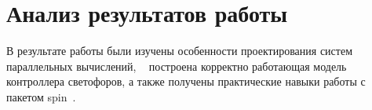 \documentclass[a4papaer,12pt]{article}
\begin{document}
\section{Анализ результатов работы}

В результате работы были изучены особенности проектирования систем параллельных вычислений,
~\cite{verification} построена корректно работающая модель контроллера светофоров, а также получены практические
навыки работы с пакетом spin~\cite{spin}.

\pagebreak



\end{document}
